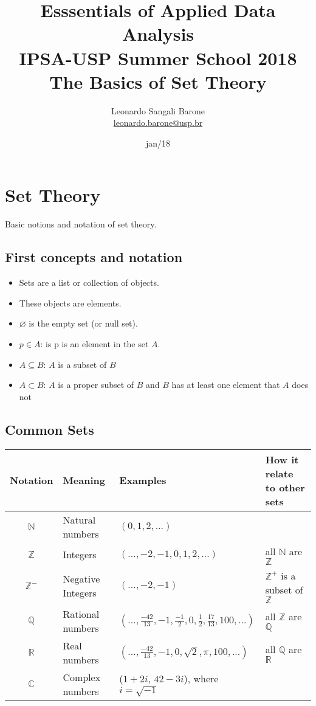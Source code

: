 \documentclass[11pt]{article}
\title{\textbf{Esssentials of Applied Data Analysis\\
				IPSA-USP Summer School 2018}\newline\\
				The Basics of Set Theory}
\author{Leonardo Sangali Barone\\ \href{leonardo.barone@usp.br}{leonardo.barone@usp.br}}
\date{jan/18}
\let\emptyset\varnothing
\begin{document}
\maketitle

\section*{Set Theory}

Basic notions and notation of set theory.

\subsection*{First concepts and notation}

	\begin{itemize}
		\item Sets are a list or collection of objects.
		\item These objects are elements.
		\item $\emptyset$ is the empty set (or null set).
		\item $p \in A$: is p is an element in the set $A$.
		\item $A \subseteq B$: $A$ is a subset of $B$ 
		\item $A \subset B$: $A$ is a proper subset of $B$ and $B$ has at least one element that $A$ does not 
	\end{itemize}

\subsection*{Common Sets}

\begin{tabular}{clll}
	Notation & Meaning & Examples & How it relate to other sets\\
	\hline
	\hline
	$\mathbb{N}$ & Natural numbers & $(0, 1, 2, ...)$ & \\
	$\mathbb{Z}$ & Integers & $(..., -2, -1, 0, 1, 2, ...)$ & all $\mathbb{N}$ are $\mathbb{Z}$\\
	$\mathbb{Z}^{-}$ & Negative Integers & $(..., -2, -1)$ & $\mathbb{Z}^{+}$ is a subset of $\mathbb{Z}$\\
	$\mathbb{Q}$ & Rational numbers & $(..., \frac{-42}{13}, -1, \frac{-1}{2}, 0, \frac{1}{2}, \frac{17}{13}, 100, ...)$ & all $\mathbb{Z}$ are $\mathbb{Q}$\\
	$\mathbb{R}$ & Real numbers & $(..., \frac{-42}{13}, -1, 0, \sqrt{2}, \pi, 100, ...)$ & all $\mathbb{Q}$ are $\mathbb{R}$\\
	$\mathbb{C}$ & Complex numbers & ($1 + 2i$, $42 - 3i$), where $i = \sqrt{-1}$ \\

\end{tabular}
\end{document}
